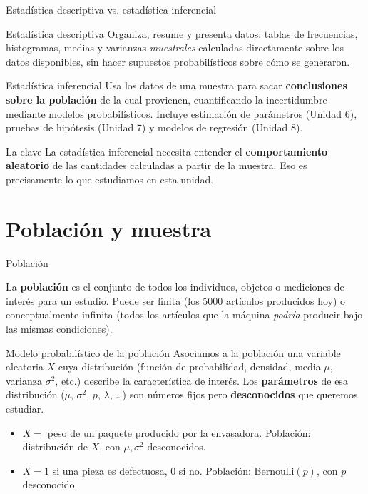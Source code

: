 \documentclass[aspectratio=169,11pt]{beamer}
\begin{document}
\begin{frame}{Estadística descriptiva vs. estadística inferencial}
\begin{block}{Estadística descriptiva}
Organiza, resume y presenta datos: tablas de frecuencias, histogramas, medias y varianzas \emph{muestrales} calculadas directamente sobre los datos disponibles, sin hacer supuestos probabilísticos sobre cómo se generaron.
\end{block}

\begin{block}{Estadística inferencial}
Usa los datos de una muestra para sacar \textbf{conclusiones sobre la población} de la cual provienen, cuantificando la incertidumbre mediante modelos probabilísticos. Incluye estimación de parámetros (Unidad 6), pruebas de hipótesis (Unidad 7) y modelos de regresión (Unidad 8).
\end{block}

\begin{alertblock}{La clave}
La estadística inferencial necesita entender el \textbf{comportamiento aleatorio} de las cantidades calculadas a partir de la muestra. Eso es precisamente lo que estudiamos en esta unidad.
\end{alertblock}
\end{frame}

\section{Población y muestra}

\begin{frame}{Población}
\begin{definition}[Población]
La \textbf{población} es el conjunto de todos los individuos, objetos o mediciones de interés para un estudio. Puede ser finita (los 5000 artículos producidos hoy) o conceptualmente infinita (todos los artículos que la máquina \emph{podría} producir bajo las mismas condiciones).
\end{definition}

\begin{block}{Modelo probabilístico de la población}
Asociamos a la población una variable aleatoria $X$ cuya distribución (función de probabilidad, densidad, media $\mu$, varianza $\sigma^2$, etc.) describe la característica de interés. Los \textbf{parámetros} de esa distribución ($\mu$, $\sigma^2$, $p$, $\lambda$, \ldots) son números fijos pero \textbf{desconocidos} que queremos estudiar.
\end{block}

\begin{example}
\begin{itemize}
\item $X = $ peso de un paquete producido por la envasadora. Población: distribución de $X$, con $\mu, \sigma^2$ desconocidos.
\item $X = 1$ si una pieza es defectuosa, $0$ si no. Población: Bernoulli$(p)$, con $p$ desconocido.
\end{itemize}
\end{example}
\end{frame}
\end{document}
